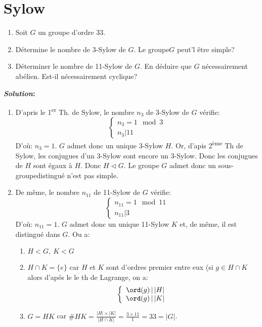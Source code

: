 \section{Sylow}

\begin{examplebox}
	\begin{enumerate}
		\item Soit $G$ un groupe d'ordre 33.	
		\item Détermine le nombre de 3-Sylow de $G$. Le groupe$G$ peut'l être simple?
		\item Déterminer le nombre de 11-Sylow de $G$. En déduire que $G$ nécessairement abélien. Est-il nécessairement cyclique?
	\end{enumerate}
		\textbf{\emph{Solution}:}

	\begin{enumerate}
		\item D'apris le 1\textsuperscript{er} Th. de Sylow, le nombre $n_3$ de 3-Sylow de $G$ vérifie:
		$$\left\{\begin{array}{r}n_3 = 1\mod 3\\n_3 | 11\end{array}\right.$$
		D'où: $n_3=1$. $G$ admet donc un unique 3-Sylow $H$. Or, d'apis 2\textsuperscript{ème} Th de Sylow, les conjugues d'un 3-Sylow sont encore un 3-Sylow. Donc les conjugues de $H$ sont égaux à $H$. Donc $H\lhd G$. Le groupe $G$ admet donc un sous-groupedistingué n'est pas simple.
		
		\item De même, le nombre $n_{11}$ de 11-Sylow de $G$ vérifie:
		$$\left\{\begin{array}{r}n_{11} = 1\mod 11\\n_{11} | 3\end{array}\right.$$
		D'où: $n_{11}=1$.
		$G$ admet donc un unique 11-Sylow $K$ et, de même, il est distingué dans $G$.
		Ou a:
		\begin{enumerate}
			\item $H<  G,\ K<  G$
			\item $H\cap K=\{e\}$ car $H$ et $K$ sont d'ordres premier entre eux (si $g\in H\cap K$ alors d'apés le le th de Lagrange, on a:
			$$\left\{\begin{array}{r}\ord(g)\,|\, |H|\\\ord(g)\,|\, |K|\end{array}\right.$$
			\item $G=HK$ car $\#HK=\frac{|H|\times|K|}{|H\cap K|}=\frac{3\times 11}{1}=33=|G|$. 
		\end{enumerate}


\end{enumerate}
\end{examplebox}

